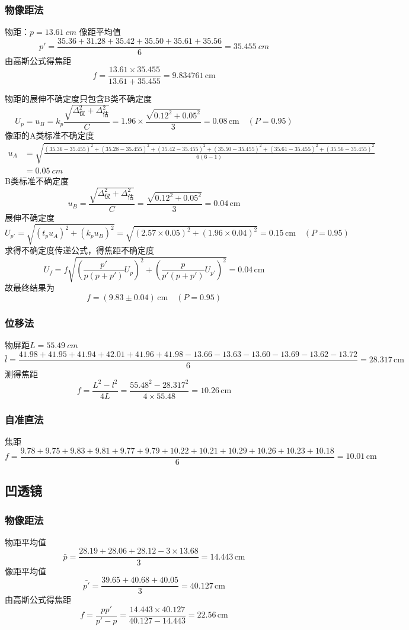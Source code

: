 \documentclass{article}
\begin{document}
\subsubsection*{物像距法}
物距：$p=\SI{13.61}{cm}$
像距平均值\[p'=\frac{35.36+31.28+35.42+35.50+35.61+35.56}{6}=\SI{35.455}{cm}\]
由高斯公式得焦距\[f=\frac{13.61\times 35.455}{13.61+35.455}=9.834761\,\mathrm{cm}\]

物距的展伸不确定度只包含B类不确定度
\[U_p=u_B=k_p\frac{\sqrt{\Delta_\text{仪}^2+\Delta_\text{估}^2}}{C}=1.96\times \frac{\sqrt{0.12^2+0.05^2}}{3}=0.08\,\mathrm{cm}\quad (P=0.95)\]
像距的A类标准不确定度\[\begin{aligned}
    u_A&=\sqrt{\frac{(35.36-35.455)^2+(35.28-35.455)^2+(35.42-35.455)^2+(35.50-35.455)^2+(35.61-35.455)^2+(35.56-35.455)^2}{6(6-1)}}\\
    &=\SI{0.05}{cm}
\end{aligned}\]
B类标准不确定度
$$
    u_B=\frac{\sqrt{\Delta_\text{仪}^2+\Delta_\text{估}^2}}{C}=\frac{\sqrt{0.12^2+0.05^2}}{3}=0.04\,\mathrm{cm}
$$
展伸不确定度
$$
U_{p'}=\sqrt{\left(t_p u_A\right)^2+\left(k_pu_B\right)^2}=\sqrt{\left(2.57\times 0.05\right)^2+\left(1.96\times0.04\right)^2}=0.15\,\mathrm{cm}  \quad(P=0.95)    
$$
求得不确定度传递公式，得焦距不确定度
\[{U_f}=f\sqrt{\left(\frac{p'}{p(p+p')}U_p\right)^2+\left(\frac{p}{p'(p+p')}U_{p'}\right)^2}=0.04\,\mathrm{cm}\]
故最终结果为
\[f=(9.83\pm0.04)\,\mathrm{cm}\quad (P=0.95)\]

\subsubsection*{位移法}
物屏距$L=\SI{55.49}{cm}$ 
\[\bar{l}=\frac{41.98+41.95+41.94+42.01+41.96+41.98-13.66-13.63-13.60-13.69-13.62-13.72}{6}=28.317\,\mathrm{cm}\] 
测得焦距$$
f=\frac{L^2-l^2}{4 L}=\frac{55.48^2-28.317^2}{4\times55.48}=10.26\,\mathrm{cm}
$$
\subsubsection*{自准直法}
焦距\[f=\frac{9.78+9.75+9.83+9.81+9.77+9.79+10.22+10.21+10.29+10.26+10.23+10.18}{6}=10.01\,\mathrm{cm}\]


\subsection*{凹透镜}



\subsubsection*{物像距法}
物距平均值\[\bar{p}=\frac{28.19+28.06+28.12-3\times13.68}{3}=14.443\,\mathrm{cm}\]
像距平均值\[\bar{p'}=\frac{39.65+40.68+40.05}{3}=40.127\,\mathrm{cm}\]
由高斯公式得焦距
\[f=\frac{pp'}{p'-p}=\frac{14.443\times40.127}{40.127-14.443}=22.56\,\mathrm{cm}\]
\end{document}
